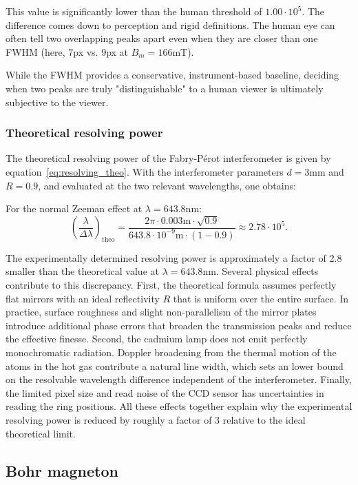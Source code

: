\documentclass{article}
\begin{document}
This value is significantly lower than the human threshold of $1.00 \cdot 10^5$. The difference comes down to perception and rigid definitions. The human eye can often tell two overlapping peaks apart even when they are closer than one FWHM (here, 7px vs. 9px at $B_m = 166$mT).

While the FWHM provides a conservative, instrument-based baseline, deciding when two peaks are truly "distinguishable" to a human viewer is ultimately subjective to the viewer.

\subsubsection{Theoretical resolving power}

The theoretical resolving power of the Fabry-Pérot interferometer is given by equation~\eqref{eq:resolving_theo}. With the interferometer parameters $d = 3$mm and $R = 0.9$, and evaluated at the two relevant wavelengths, one obtains:

For the normal Zeeman effect at $\lambda = 643.8$nm:
\begin{equation}
    \left(\frac{\lambda}{\Delta\lambda}\right)_\mathrm{theo} = \frac{2\pi \cdot 0.003\mathrm{m} \cdot \sqrt{0.9}}{643.8 \cdot 10^{-9}\mathrm{m} \cdot (1 - 0.9)} \approx 2.78 \cdot 10^5.
\end{equation}

The experimentally determined resolving power is approximately a factor of 2.8 smaller than the theoretical value at $\lambda = 643.8$nm. Several physical effects contribute to this discrepancy. First, the theoretical formula assumes perfectly flat mirrors with an ideal reflectivity $R$ that is uniform over the entire surface. In practice, surface roughness and slight non-parallelism of the mirror plates introduce additional phase errors that broaden the transmission peaks and reduce the effective finesse. Second, the cadmium lamp does not emit perfectly monochromatic radiation. Doppler broadening from the thermal motion of the atoms in the hot gas contribute a natural line width, which sets an lower bound on the resolvable wavelength difference independent of the interferometer. Finally, the limited pixel size and read noise of the CCD sensor has uncertainties in reading the ring positions. All these effects together explain why the experimental resolving power is reduced by roughly a factor of 3 relative to the ideal theoretical limit.

\subsection{Bohr magneton}
\end{document}
